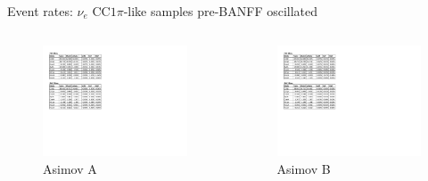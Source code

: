 \documentclass{beamer}
\begin{document}
\begin{frame}{Event rates: $\nu_e\text{ CC}1\pi$-like samples pre-BANFF oscillated}
	\centering

	\begin{columns}
		\begin{column}{0.5\paperwidth}
			\begin{figure}
				\includegraphics[page=3, trim={0cm 15cm 13cm 1cm}, clip, scale=0.52] {images/rates/prefit_A}
				\caption*{Asimov A}
			\end{figure}
		\end{column}
		\begin{column}{0.5\paperwidth}
			\begin{figure}
				\includegraphics[page=3, trim={0cm 15cm 13cm 1cm}, clip, scale=0.52] {images/rates/prefit_A}
				\caption*{Asimov B}
			\end{figure}
		\end{column}
	\end{columns}
\end{frame}
\end{document}
